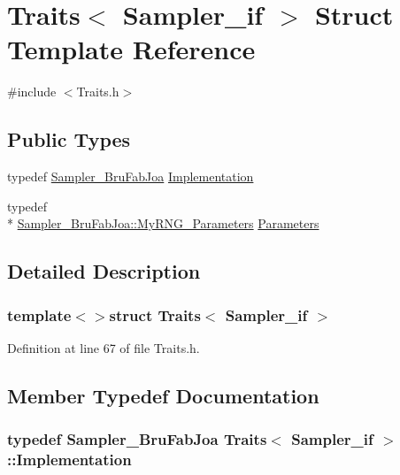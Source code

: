 \hypertarget{struct_traits_3_01_sampler__if_01_4}{\section{Traits$<$ Sampler\-\_\-if $>$ Struct Template Reference}
\label{struct_traits_3_01_sampler__if_01_4}
}


{\ttfamily \#include $<$Traits.\-h$>$}

\subsection*{Public Types}
\begin{DoxyCompactItemize}
\item 
typedef \hyperlink{class_sampler___bru_fab_joa}{Sampler\-\_\-\-Bru\-Fab\-Joa} \hyperlink{struct_traits_3_01_sampler__if_01_4_ac671b4707ba7d48439b364bdc9341a2e}{Implementation}
\item 
typedef \\*
\hyperlink{struct_sampler___bru_fab_joa_1_1_my_r_n_g___parameters}{Sampler\-\_\-\-Bru\-Fab\-Joa\-::\-My\-R\-N\-G\-\_\-\-Parameters} \hyperlink{struct_traits_3_01_sampler__if_01_4_a3e3228ca7fdd226d0a78be29ba406660}{Parameters}
\end{DoxyCompactItemize}


\subsection{Detailed Description}
\subsubsection*{template$<$$>$struct Traits$<$ Sampler\-\_\-if $>$}



Definition at line 67 of file Traits.\-h.



\subsection{Member Typedef Documentation}
\hypertarget{struct_traits_3_01_sampler__if_01_4_ac671b4707ba7d48439b364bdc9341a2e}{
\subsubsection[{Implementation}]{\setlength{\rightskip}{0pt plus 5cm}typedef {\bf Sampler\-\_\-\-Bru\-Fab\-Joa} {\bf Traits}$<$ {\bf Sampler\-\_\-if} $>$\-::{\bf Implementation}}}\label{struct_traits_3_01_sampler__if_01_4_ac671b4707ba7d48439b364bdc9341a2e}


